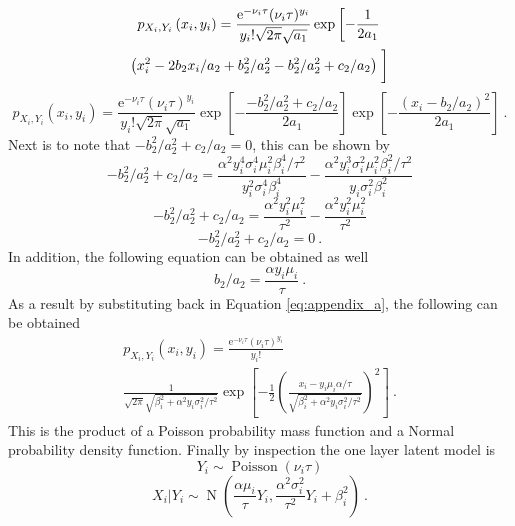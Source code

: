 \documentclass[12pt]{report}
\DeclareMathOperator{\normal}{N}
\DeclareMathOperator{\poisson}{Poisson}
\newcommand{\euler}{\mathrm{e}}
\begin{document}
\begin{multline*}
p_{X_i,Y_i}\left(x_i,y_i\right)=\frac{\euler^{-\nu_i\tau}(\nu_i\tau)^{y_i}}{y_i!\sqrt{2\pi}\sqrt{a_1}}
\exp\left[-\frac{1}{2a_1}
\right.
\\
\left(x_i^2-2b_2x_i/a_2+b_2^2/a_2^2-b_2^2/a_2^2+c_2/a_2\right)
\left.\vphantom{-\frac{1}{2a_1}}\right]
\end{multline*}
\begin{equation*}
p_{X_i,Y_i}\left(x_i,y_i\right)=\frac{\euler^{-\nu_i\tau}(\nu_i\tau)^{y_i}}{y_i!\sqrt{2\pi}\sqrt{a_1}}
\exp\left[-\frac{-b_2^2/a_2^2+c_2/a_2}{2a_1}\right]
\exp\left[-\frac{(x_i-b_2/a_2)^2}{2a_1}
\right] \ .
\end{equation*}
Next is to note that $-b_2^2/a_2^2+c_2/a_2=0$, this can be shown by
\begin{equation*}
-b_2^2/a_2^2+c_2/a_2 = 
\frac{\alpha^2 y_i^4\sigma_i^4\mu_i^2\beta_i^4/\tau^2}{y_i^2\sigma_i^4\beta_i^4}
-
\frac{\alpha^2y_i^3\sigma_i^2\mu_i^2\beta_i^2/\tau^2}{y_i\sigma_i^2\beta_i^2}
\end{equation*}
\begin{equation*}
-b_2^2/a_2^2+c_2/a_2 = 
\frac{\alpha^2 y_i^2\mu_i^2}{\tau^2}
-
\frac{\alpha^2y_i^2\mu_i^2}{\tau^2}
\end{equation*}
\begin{equation}
-b_2^2/a_2^2+c_2/a_2 = 0 \ .
\end{equation}
In addition, the following equation can be obtained as well
\begin{equation}
b_2/a_2 = \frac{\alpha y_i \mu_i}{\tau} \ .
\end{equation}
As a result by substituting back in Equation \eqref{eq:appendix_a}, the following can be obtained
\begin{multline}
p_{X_i,Y_i}\left(x_i,y_i\right)=
\frac{\euler^{-\nu_i\tau}(\nu_i\tau)^{y_i}}{y_i!}
\\
\frac{1}{\sqrt{2\pi}\sqrt{\beta_i^2+\alpha^2y_i\sigma_i^2/\tau^2}}
\exp\left[-\frac{1}{2}\left(\frac{x_i-y_i\mu_i\alpha/\tau}{\sqrt{\beta_i^2+\alpha^2y_i\sigma_i^2/\tau^2}}\right)^2\right] \ .
\end{multline}
This is the product of a Poisson probability mass function and a Normal probability density function. Finally by inspection the one layer latent model is
\begin{equation}
Y_i\sim\poisson(\nu_i\tau)
\end{equation}
\begin{equation}
X_i|Y_i\sim\normal\left(
\frac{\alpha\mu_i}{\tau}Y_i,\frac{\alpha^2\sigma_i^2}{\tau^2}Y_i+\beta_i^2
\right) \ .
\end{equation}
\end{document}
